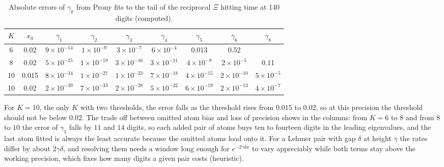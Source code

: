 \begin{table}[h]\centering\scriptsize\setlength{\tabcolsep}{2.5pt}
\begin{tabular}{ccccccccc}
\toprule
$K$ & $x_0$ & $\gamma_1$ & $\gamma_2$ & $\gamma_3$ & $\gamma_4$ & $\gamma_5$ & $\gamma_6$ & $\gamma_8$\\
\midrule
6 & 0.02 & $9\times10^{-14}$ & $1\times10^{-9}$ & $3\times10^{-7}$ & $6\times10^{-4}$ & 0.013 & 0.52 & \\
8 & 0.02 & $5\times10^{-25}$ & $1\times10^{-19}$ & $3\times10^{-16}$ & $3\times10^{-11}$ & $4\times10^{-9}$ & $2\times10^{-5}$ & 0.11\\
10 & 0.015 & $8\times10^{-34}$ & $1\times10^{-27}$ & $1\times10^{-23}$ & $7\times10^{-18}$ & $4\times10^{-15}$ & $2\times10^{-10}$ & $5\times10^{-5}$\\
10 & 0.02 & $2\times10^{-39}$ & $7\times10^{-33}$ & $2\times10^{-28}$ & $5\times10^{-22}$ & $6\times10^{-19}$ & $2\times10^{-13}$ & $4\times10^{-7}$\\
\bottomrule
\end{tabular}
\caption{Absolute errors of $\gamma_k$ from Prony fits to the tail of the reciprocal $\Xi$ hitting time at 140 digits (computed).}\label{ev:tab:prony2}
\end{table}

For $K=10$, the only $K$ with two thresholds, the error falls as the threshold rises from $0.015$ to $0.02$, so at this precision the threshold should not be below $0.02$. The trade off between omitted atom bias and loss of precision shows in the columns: from $K=6$ to $8$ and from $8$ to $10$ the error of $\gamma_1$ falls by $11$ and $14$ digits, so each added pair of atoms buys ten to fourteen digits in the leading eigenvalues, and the last atom fitted is always the least accurate because the omitted atoms load onto it. For a Lehmer pair with gap $\delta$ at height $\gamma$ the rates differ by about $2\gamma\delta$, and resolving them needs a window long enough for $e^{-2\gamma\delta x}$ to vary appreciably while both terms stay above the working precision, which fixes how many digits a given pair costs (heuristic).
